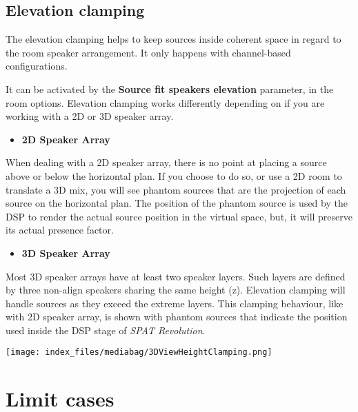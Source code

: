 \documentclass[
  letterpaper,
  DIV=11,
  numbers=noendperiod]{scrreport}
\providecommand{\tightlist}{%
  \setlength{\itemsep}{0pt}\setlength{\parskip}{0pt}}\usepackage{longtable,booktabs,array}
\begin{document}
\hypertarget{elevation-clamping}{%
\subsection{Elevation clamping}\label{elevation-clamping}}

The elevation clamping helps to keep sources inside coherent space in
regard to the room speaker arrangement. It only happens with
channel-based configurations.

It can be activated by the \textbf{Source fit speakers elevation}
parameter, in the room options. Elevation clamping works differently
depending on if you are working with a 2D or 3D speaker array.

\begin{itemize}
\tightlist
\item
  \textbf{2D Speaker Array}
\end{itemize}

When dealing with a 2D speaker array, there is no point at placing a
source above or below the horizontal plan. If you choose to do so, or
use a 2D room to translate a 3D mix, you will see phantom sources that
are the projection of each source on the horizontal plan. The position
of the phantom source is used by the DSP to render the actual source
position in the virtual space, but, it will preserve its actual presence
factor.

\begin{itemize}
\tightlist
\item
  \textbf{3D Speaker Array}
\end{itemize}

Most 3D speaker arrays have at least two speaker layers. Such layers are
defined by three non-align speakers sharing the same height (z).
Elevation clamping will handle sources as they exceed the extreme
layers. This clamping behaviour, like with 2D speaker array, is shown
with phantom sources that indicate the position used inside the DSP
stage of \emph{SPAT Revolution}.

\texttt{[image: index\_files/mediabag/3DViewHeightClamping.png]}

\hypertarget{limit-cases}{%
\section{Limit cases}\label{limit-cases}}
\end{document}
